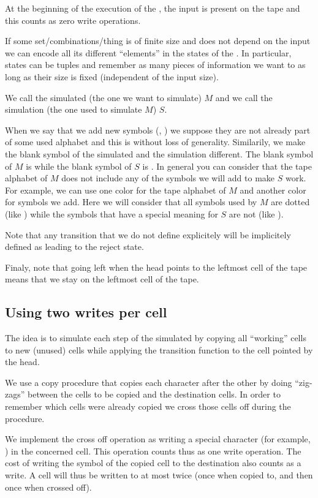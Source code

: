 At the beginning of the execution of the \TM{}, the input is
present on the tape and this counts as zero write operations.

If some set/combinations/thing is of finite size and does not depend on the input
we can encode all its different ``elements'' in the states of the \TM{}.
In particular, states can be tuples and remember as many pieces of
information we want to as long as their size is fixed (independent of the
input size).

We call the simulated \TM{} (the one we want to simulate) \(M\) and we
call the simulation \TM{} (the one used to simulate \(M\)) \(S\).

When we say that we add new symbols (\X{}, \e{}) we suppose they
are not already part of some used alphabet and this is without loss of
generality.
Similarily, we make the blank symbol of the simulated \TM{} and the
simulation \TM{} different. The blank symbol of \(M\)
is \°{} while the blank symbol of \(S\)
is \0{}. In general you can consider that the tape alphabet of \(M\)
does not include any of the symbols we will add to make \(S\) work.
For example, we can use one color for the tape alphabet of \(M\) and
another color for symbols we add. Here we will consider that all symbols used
by \(M\) are dotted (like \°{}) while the symbols that
have a special meaning for \(S\) are not (like \0{}).

Note that any transition that we do not define explicitely will be implicitely
defined as leading to the reject state.

Finaly, note that going left when the head points to the leftmost cell of the
tape means that we stay on the leftmost cell of the tape.

\subsection{Using two writes per cell}
The idea is to simulate each step of the simulated
\TM{} by copying all ``working'' cells to new (unused) cells
while applying the transition function to the cell pointed by the head.

We use a copy procedure that copies each character after
the other by doing ``zig-zags'' between the cells to be copied and the destination
cells. In order to remember which cells were already copied we cross those
cells off during the procedure.

We implement the cross off operation as
writing a special character (for example, \X{}) in the concerned cell.
This operation counts thus as one write operation. The cost of writing the
symbol of the copied cell to the destination also counts as a write. A cell
will thus be written to at most twice (once when copied to, and then
once when crossed off).

